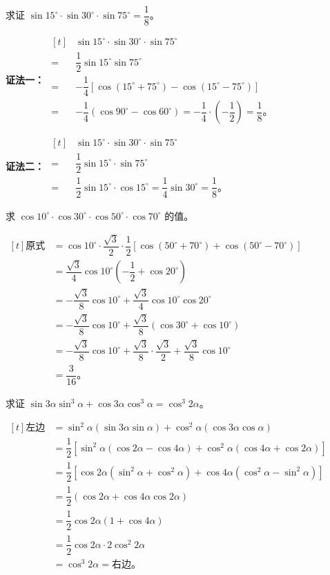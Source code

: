 \liti 求证 $\sin15^\circ \cdot \sin30^\circ \cdot \sin75^\circ = \dfrac{1}{8}$。\jiange

\textbf{证法一：} $\begin{aligned}[t]
    & \sin15^\circ \cdot \sin30^\circ \cdot \sin75^\circ \\
    = & \dfrac{1}{2} \sin15^\circ \sin75^\circ \\
    = & -\dfrac{1}{4} [\cos(15^\circ + 75^\circ) - \cos(15^\circ - 75^\circ)] \\
    = & -\dfrac{1}{4} (\cos90^\circ - \cos60^\circ) = -\dfrac{1}{4} \cdot \left( -\dfrac{1}{2} \right) = \dfrac{1}{8} \text{。}
\end{aligned}$ \jiange

\textbf{证法二：} $\begin{aligned}[t]
    & \sin15^\circ \cdot \sin30^\circ \cdot \sin75^\circ \\
    = & \dfrac{1}{2} \sin15^\circ \cdot \sin75^\circ \\
    = & \dfrac{1}{2} \sin15^\circ \cdot \cos15^\circ = \dfrac{1}{4} \sin30^\circ = \dfrac{1}{8} \text{。}
\end{aligned}$ \jiange

\liti 求 $\cos10^\circ \cdot \cos30^\circ \cdot \cos50^\circ \cdot \cos70^\circ$ 的值。

\jie $\begin{aligned}[t]
    \text{原式} &= \cos10^\circ \cdot \dfrac{\sqrt{3}}{2} \cdot \dfrac{1}{2}[\cos(50^\circ + 70^\circ) + \cos(50^\circ - 70^\circ)] \\
    &= \dfrac{\sqrt{3}}{4} \cos10^\circ \left( -\dfrac{1}{2} + \cos20^\circ \right) \\
    &= -\dfrac{\sqrt{3}}{8} \cos10^\circ + \dfrac{\sqrt{3}}{4} \cos10^\circ \cos20^\circ \\
    &= -\dfrac{\sqrt{3}}{8} \cos10^\circ + \dfrac{\sqrt{3}}{8}(\cos30^\circ + \cos10^\circ) \\
    &= -\dfrac{\sqrt{3}}{8} \cos10^\circ + \dfrac{\sqrt{3}}{8} \cdot \dfrac{\sqrt{3}}{2} + \dfrac{\sqrt{3}}{8} \cos10^\circ \\
    &= \dfrac{3}{16} \text{。}
\end{aligned}$ \jiange

\liti 求证 $\sin3\alpha \sin^3\alpha + \cos3\alpha \cos^3\alpha = \cos^3 2\alpha$。

\zhengming $\begin{aligned}[t]
    \text{左边} &= \sin^2\alpha(\sin3\alpha \sin\alpha) + \cos^2\alpha(\cos3\alpha \cos\alpha) \\
    &= \dfrac{1}{2} [\sin^2\alpha(\cos2\alpha - \cos4\alpha) + \cos^2\alpha(\cos4\alpha + \cos2\alpha)] \\
    &= \dfrac{1}{2} [\cos2\alpha(\sin^2\alpha + \cos^2\alpha) + \cos4\alpha(\cos^2\alpha - \sin^2\alpha)] \\
    &= \dfrac{1}{2} (\cos2\alpha + \cos4\alpha \cos2\alpha) \\
    &= \dfrac{1}{2} \cos2\alpha (1 + \cos4\alpha) \\
    &= \dfrac{1}{2} \cos2\alpha \cdot 2\cos^2 2\alpha \\
    &= \cos^3 2\alpha = \text{右边。}
\end{aligned}$ \jiange

